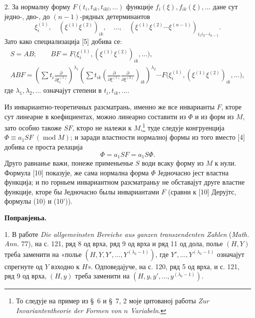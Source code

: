 ﻿\documentclass[11pt]{article}
\providecommand{\p}{\partial}
\providecommand{\modu}[1]{\;(\operatorname{mod} #1)}
\begin{document}
2. За нормалну форму \(F(t_i,t_{ik},t_{ikl},\ldots)\) функције \(f_i(\xi),f_{ik}(\xi),\ldots\) дане сут једно-, дво-, до \((n-1)\)-рядных детерминантов
\[
        \xi_i^{(1)},\quad (\xi^{(1)}\xi^{(2)})_{ik},\quad\ldots,\quad
        (\xi^{(1)}\xi^{(2)}\cdots\xi^{(n-1)})_{i_1i_2\cdots i_{n-1}}.
\]
Зато како специализација [5] добива се:
\[
\begin{gathered}
        S=AB;\qquad
        BF=F\bigl(\xi_i^{(1)},(\xi^{(1)}\xi^{(2)})_{ik},\ldots\bigr),\\
        ABF=\left(\sum t_i\frac{\p}{\p\xi_i^{(1)}}\right)^{\lambda_1}
        \left(\sum t_{ik}\left(\frac{\p}{\p\xi^{(1)}}\frac{\p}{\p\xi^{(2)}}\right)_{ik}\right)^{\lambda_2}
        \cdots F\bigl(\xi_i^{(1)},(\xi^{(1)}\xi^{(2)})_{ik},\ldots\bigr),
\end{gathered}
\]
где \(\lambda_1,\lambda_2,\ldots\) означајут степени в \(t_i,t_{ik},\ldots\).

Из инвариантно-теоретичных разсматрань, именно же все инварианты \(F\), кторе сут линеарне в коефициентах, можно линеарно составити из \(\Phi\) и из форм из \(M\), зато особно такоже \(SF\), кторо не належи к \(M\),\footnote{То следује на пример из \S~6 и \S~7, 2 моје цитованој работы \emph{Zur Invariantentheorie der Formen von \(n\) Variabeln}.} туде следује конгруенција \(\Phi\equiv a_1SF\modu{M}\); и заради властности нормалној формы из того вместо [4] добива се проста релација
\begin{equation}
        \Phi=a_1SF=a_1S\Phi.
\tag{10}
\end{equation}
Друго равнанье важи, понеже применьенье \(S\) води всаку форму из \(M\) к нули. Формула [10] показује, же сама нормална форма \(\Phi\) Једночасно јест властна функција; и по горньем инвариантном разсматраньу не обставајут друге властне функције, кторе бы Једночасно былы инвариантами \(F\) (сравни к [10] Дерујтс, формулы (10) и (10')).

\begin{center}
\textbf{Поправјеньа.}
\end{center}

1. В работе \emph{Die allgemeinsten Bereiche aus ganzen transzendenten Zahlen} (\emph{Math. Ann.} 77), на с. 121, ряд 8 од врха, ряд 9 од врха и ряд 11 од дола, полье \((H,Y)\) треба заменити на «полье \((H,Y,Y',\ldots,Y^{(\lambda_0-1)})\), где \(Y',\ldots,Y^{(\lambda_0-1)}\) означајут спрегнуте од \(Y\) взходно к \(H\)». Одповедајуче, на с. 120, ряд 5 од врха, и с. 121, ряд 9 од врха, \((H,y)\) треба заменити на \((H,y,y',\ldots,y^{(\lambda_0-1)})\).
\end{document}
